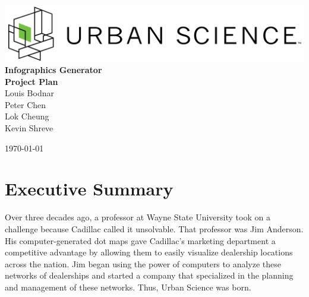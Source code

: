 \documentclass[11pt,a4paper,oneside]{article}
\begin{document}
\begin{titlepage}



\begin{center}

\includegraphics[width=1\textwidth]{images/sponsor-logo.png}\\[1cm]    

{ \huge \bfseries Infographics Generator}\\[0.4cm]
{ \large \bfseries Project Plan}\\[0.4cm]

Louis Bodnar\\
Peter Chen\\
Lok Cheung\\
Kevin Shreve\\



\vfill

{\large \today}

\end{center}

\end{titlepage}

\tableofcontents

\newpage

\listoffigures

\newpage

\section{Executive Summary}


Over three decades ago, a professor at Wayne State University took on a challenge because Cadillac called it unsolvable.  That professor was Jim Anderson.  His computer-generated dot maps gave Cadillac's marketing department a competitive advantage by allowing them to easily visualize dealership locations across the nation.  Jim began using the power of computers to analyze these networks of dealerships and started a company that specialized in the planning and management of these networks.  Thus, Urban Science was born.\\
\end{document}
